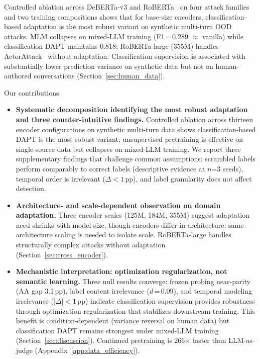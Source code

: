 Controlled ablation across DeBERTa-v3 and RoBERTa~\citep{liu2019roberta} on four attack families and two training compositions shows that for base-size encoders, classification-based adaptation is the most robust variant on synthetic multi-turn OOD attacks. MLM collapses on mixed-LLM training (F1\,=\,0.289 $\approx$ vanilla) while classification DAPT maintains 0.818; RoBERTa-large (355M) handles ActorAttack~\citep{ren2024actorattack} without adaptation. Classification supervision is associated with substantially lower prediction variance on synthetic data but not on human-authored conversations (Section~\ref{sec:human_data}).

Our contributions:
\begin{itemize}[leftmargin=*, itemsep=2pt, topsep=4pt]
  \item \textbf{Systematic decomposition identifying the most robust adaptation and three counter-intuitive findings.} Controlled ablation across thirteen encoder configurations on synthetic multi-turn data shows classification-based DAPT is the most robust variant; unsupervised pretraining is effective on single-source data but collapses on mixed-LLM training. We report three supplementary findings that challenge common assumptions: scrambled labels perform comparably to correct labels (descriptive evidence at $n$=3 seeds), temporal order is irrelevant ($\Delta < 1$\,pp), and label granularity does not affect detection.

  \item \textbf{Architecture- and scale-dependent observation on domain adaptation.} Three encoder scales (125M, 184M, 355M) suggest adaptation need shrinks with model size, though encoders differ in architecture; same-architecture scaling is needed to isolate scale. RoBERTa-large handles structurally complex attacks without adaptation (Section~\ref{sec:cross_encoder}).

  \item \textbf{Mechanistic interpretation: optimization regularization, not semantic learning.} Three null results converge: frozen probing near-parity (AA gap 3.1\,pp), label content irrelevance ($d$\,=\,0.09), and temporal modeling irrelevance ($|\Delta| < 1$\,pp) indicate classification supervision provides robustness through optimization regularization that stabilizes downstream training. This benefit is condition-dependent (variance reversal on human data) but classification DAPT remains strongest under mixed-LLM training (Section~\ref{sec:discussion}). Continued pretraining is 266$\times$ faster than LLM-as-judge (Appendix~\ref{app:data_efficiency}).
\end{itemize}
